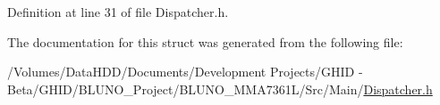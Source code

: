 \-Definition at line 31 of file \-Dispatcher.\-h.



\-The documentation for this struct was generated from the following file\-:\begin{DoxyCompactItemize}
\item 
/\-Volumes/\-Data\-H\-D\-D/\-Documents/\-Development Projects/\-G\-H\-I\-D -\/ Beta/\-G\-H\-I\-D/\-B\-L\-U\-N\-O\-\_\-\-Project/\-B\-L\-U\-N\-O\-\_\-\-M\-M\-A7361\-L/\-Src/\-Main/\hyperlink{_dispatcher_8h}{\-Dispatcher.\-h}\end{DoxyCompactItemize}
